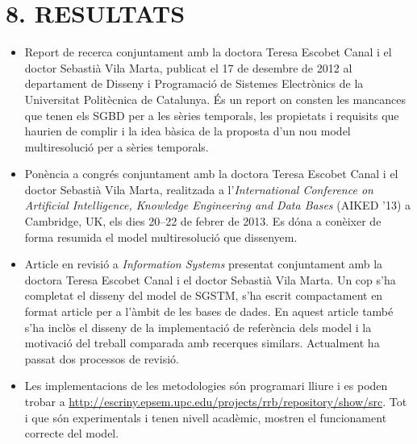 \documentclass{article}
\begin{document}
\begin{itemize}




\end{itemize}





\section*{8. RESULTATS}

\begin{itemize}


\item Report de recerca conjuntament amb la
  doctora Teresa Escobet Canal i el doctor Sebastià Vila Marta,
  publicat el 17 de desembre de 2012 al departament de Disseny i
  Programació de Sistemes Electrònics de la Universitat Politècnica de
  Catalunya. És un report on consten les mancances que tenen els
  \gls{SGBD} per a les sèries temporals, les propietats i requisits
  que haurien de complir i la idea bàsica de la proposta d'un nou
  model multiresolució per a sèries temporals.

\item Ponència a congrés  conjuntament amb la
  doctora Teresa Escobet Canal i el doctor Sebastià Vila Marta, realitzada
  a l'\emph{International Conference on Artificial Intelligence, Knowledge
  Engineering and Data Bases} (AIKED '13) a Cambridge, UK, els dies
  20--22 de febrer de 2013.  Es dóna a conèixer de forma resumida el
  model multiresolució que dissenyem.


\item Article en revisió a \emph{Information Systems} presentat
  conjuntament amb la doctora Teresa Escobet Canal i el doctor
  Sebastià Vila Marta. Un cop s'ha completat el disseny del model de
  SGSTM, s'ha escrit compactament en format article per a
  l'àmbit de les bases de dades.  En aquest article també s'ha inclòs
  el disseny de la implementació de referència dels model i la
  motivació del treball comparada amb recerques similars.
  Actualment ha passat dos processos de revisió.

\item Les implementacions de les metodologies són  programari lliure
  i es poden trobar a
  \url{http://escriny.epsem.upc.edu/projects/rrb/repository/show/src}. Tot
  i que són experimentals i tenen nivell acadèmic, mostren el
  funcionament correcte del model.

\end{itemize}
\end{document}
